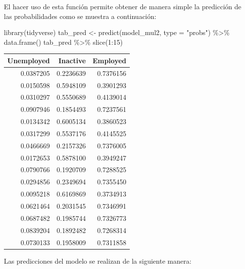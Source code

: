 \documentclass[
  12pt,
]{book}
\newenvironment{Shaded}{\begin{snugshade}}{\end{snugshade}}
\newcommand{\AttributeTok}[1]{\textcolor[rgb]{0.77,0.63,0.00}{#1}}
\newcommand{\DecValTok}[1]{\textcolor[rgb]{0.00,0.00,0.81}{#1}}
\newcommand{\FunctionTok}[1]{\textcolor[rgb]{0.00,0.00,0.00}{#1}}
\newcommand{\NormalTok}[1]{#1}
\newcommand{\OtherTok}[1]{\textcolor[rgb]{0.56,0.35,0.01}{#1}}
\newcommand{\SpecialCharTok}[1]{\textcolor[rgb]{0.00,0.00,0.00}{#1}}
\newcommand{\StringTok}[1]{\textcolor[rgb]{0.31,0.60,0.02}{#1}}
\begin{document}
El hacer uso de esta función permite obtener de manera simple la predicción de las probabilidades como se muestra a continuación:

\begin{Shaded}
\begin{Highlighting}[]
\FunctionTok{library}\NormalTok{(tidyverse)}
\NormalTok{tab\_pred }\OtherTok{\textless{}{-}} \FunctionTok{predict}\NormalTok{(model\_mul2, }\AttributeTok{type =} \StringTok{"probs"}\NormalTok{) }\SpecialCharTok{\%\textgreater{}\%} 
  \FunctionTok{data.frame}\NormalTok{()}
\NormalTok{tab\_pred }\SpecialCharTok{\%\textgreater{}\%} \FunctionTok{slice}\NormalTok{(}\DecValTok{1}\SpecialCharTok{:}\DecValTok{15}\NormalTok{)}
\end{Highlighting}
\end{Shaded}

\begin{tabular}{r|r|r}
\hline
Unemployed & Inactive & Employed\\
\hline
0.0387205 & 0.2236639 & 0.7376156\\
\hline
0.0150598 & 0.5948109 & 0.3901293\\
\hline
0.0310297 & 0.5550689 & 0.4139014\\
\hline
0.0907946 & 0.1854493 & 0.7237561\\
\hline
0.0134342 & 0.6005134 & 0.3860523\\
\hline
0.0317299 & 0.5537176 & 0.4145525\\
\hline
0.0466669 & 0.2157326 & 0.7376005\\
\hline
0.0172653 & 0.5878100 & 0.3949247\\
\hline
0.0790766 & 0.1920709 & 0.7288525\\
\hline
0.0294856 & 0.2349694 & 0.7355450\\
\hline
0.0095218 & 0.6169869 & 0.3734913\\
\hline
0.0621464 & 0.2031545 & 0.7346991\\
\hline
0.0687482 & 0.1985744 & 0.7326773\\
\hline
0.0839204 & 0.1892482 & 0.7268314\\
\hline
0.0730133 & 0.1958009 & 0.7311858\\
\hline
\end{tabular}

Las predicciones del modelo se realizan de la siguiente manera:

\begin{Shaded}
\end{Shaded}
\end{document}
